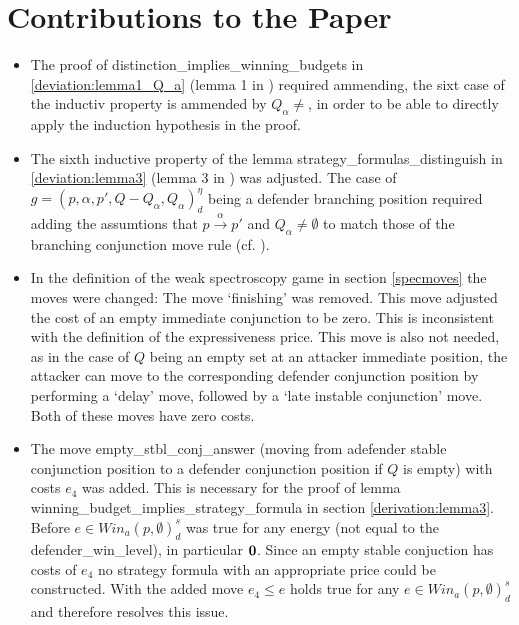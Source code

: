 \section{Contributions to the Paper}
\begin{itemize}
\item The proof of distinction\_implies\_winning\_budgets in \ref{deviation:lemma1_Q_a} 
(lemma 1 in \cite{bisping2023lineartimebranchingtime}) required ammending, the sixt case
of the inductiv property is ammended by $Q_\alpha \neq {}$, in order to be able to directly
apply the induction hypothesis in the proof.

\item The sixth inductive property of the lemma strategy\_formulas\_distinguish in \ref{deviation:lemma3} 
(lemma 3 in \cite{bisping2023lineartimebranchingtime}) was adjusted.
The case of $g=(p,\alpha ,p', Q- Q_\alpha, Q_\alpha)_d^\eta$ being a defender branching position
required adding the assumtions that $p \overset{\alpha}{\longrightarrow} p'$ and $Q_\alpha \neq \emptyset$
to match those of the branching conjunction move rule (cf. \cite[p. 13]{bisping2023lineartimebranchingtime}). 

\item In the definition of the weak spectroscopy game in section \ref{specmoves} the moves were changed: 
The move `finishing' was removed. This move adjusted the cost of an empty immediate conjunction to be zero.
This is inconsistent with the definition of the expressiveness price. This move is also not needed, as in the case of $Q$ being an empty set at an attacker immediate position, the attacker can move to the corresponding
defender conjunction position by performing a `delay' move, followed by a `late instable conjunction' move. Both of these moves have zero costs.

\item The move empty\_stbl\_conj\_answer (moving from adefender stable conjunction position to a defender conjunction
position if $Q$ is empty) with costs $e_4$ was added. This is necessary for the proof of lemma 
winning\_budget\_implies\_strategy\_formula in section \ref{derivation:lemma3}. Before 
$e \in Win_a (p, \emptyset)_d^s $ was true for any energy (not equal to the defender\_win\_level), in particular $\bold{0}$. 
Since an empty stable conjuction has costs of $e_4$ no strategy formula with an appropriate price could be constructed. 
With the added move $e_4 \leq e $ holds true for any $e \in Win_a (p, \emptyset)_d^s $ and therefore resolves this issue.


\end{itemize}

